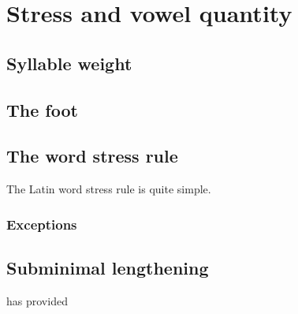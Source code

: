 \chapter{Stress and vowel quantity}

\section{Syllable weight}

\section{The foot}

\section{The word stress rule}

The Latin word stress rule is quite simple.

\subsection{Exceptions}

\section{Subminimal lengthening}

\citet{Mester1994} has provided
